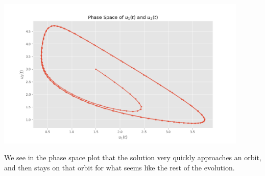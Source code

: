 \documentclass[boxes,pages]{homework}
\begin{document}
\begin{solution}
\begin{center}
		\includegraphics[width=0.9\textwidth]{phase-space.png}
	\end{center}
	We see in the phase space plot that the solution very quickly approaches an orbit, and then stays on that orbit for what seems like the rest of the evolution.

\end{solution}
\end{document}
